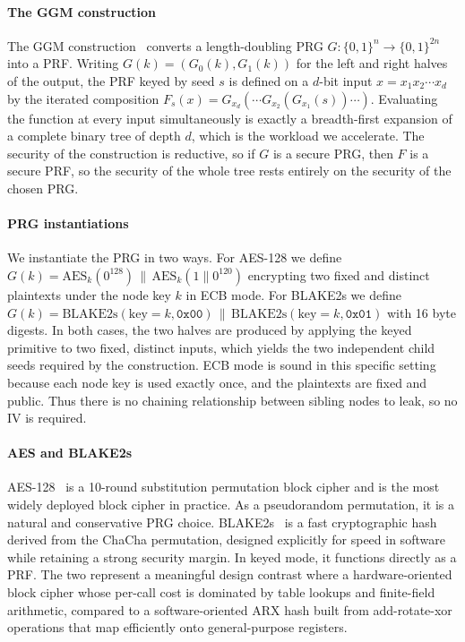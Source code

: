 \documentclass[conference]{IEEEtran}
\begin{document}
\paragraph{The GGM construction}
The GGM construction~\cite{ggm1986} converts a length-doubling PRG $G:\{0,1\}^n \to \{0,1\}^{2n}$ into a PRF. Writing $G(k) = (G_0(k), G_1(k))$ for the left and right halves of the output, the PRF keyed by seed $s$ is defined on a $d$-bit input $x = x_1 x_2 \cdots x_d$ by the iterated composition $F_s(x) = G_{x_d}(\cdots G_{x_2}(G_{x_1}(s))\cdots)$. Evaluating the function at every input simultaneously is exactly a breadth-first expansion of a complete binary tree of depth $d$, which is the workload we accelerate. The security of the construction is reductive, so if $G$ is a secure PRG, then $F$ is a secure PRF, so the security of the whole tree rests entirely on the security of the chosen PRG.

\paragraph{PRG instantiations}
We instantiate the PRG in two ways. For AES-128 we define $G(k) = \mathrm{AES}_k(0^{128}) \,\|\, \mathrm{AES}_k(1\|0^{120})$ encrypting two fixed and distinct plaintexts under the node key $k$ in ECB mode. For BLAKE2s we define $G(k) = \mathrm{BLAKE2s}(\text{key}{=}k, \texttt{0x00}) \,\|\, \mathrm{BLAKE2s}(\text{key}{=}k, \texttt{0x01})$ with 16 byte digests. In both cases, the two halves are produced by applying the keyed primitive to two fixed, distinct inputs, which yields the two independent child seeds required by the construction. ECB mode is sound in this specific setting because each node key is used exactly once, and the plaintexts are fixed and public. Thus there is no chaining relationship between sibling nodes to leak, so no IV is required.

\paragraph{AES and BLAKE2s}
AES-128~\cite{fips197} is a 10-round substitution permutation block cipher and is the most widely deployed block cipher in practice. As a pseudorandom permutation, it is a natural and conservative PRG choice. BLAKE2s~\cite{rfc7693} is a fast cryptographic hash derived from the ChaCha permutation, designed explicitly for speed in software while retaining a strong security margin. In keyed mode, it functions directly as a PRF. The two represent a meaningful design contrast where a hardware-oriented block cipher whose per-call cost is dominated by table lookups and finite-field arithmetic, compared to a software-oriented ARX hash built from add-rotate-xor operations that map efficiently onto general-purpose registers.
\end{document}
